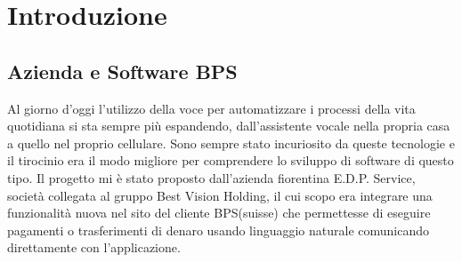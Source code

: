 \chapter{Introduzione}

\section{Azienda e Software BPS}
Al giorno d'oggi l'utilizzo della voce per automatizzare i processi della vita quotidiana si sta sempre più espandendo, dall'assistente vocale nella propria casa a quello nel proprio cellulare. Sono sempre stato incuriosito da queste tecnologie e il tirocinio era il modo migliore per comprendere lo sviluppo di software di questo tipo. Il progetto mi è stato proposto dall'azienda fiorentina E.D.P. Service, società collegata al gruppo Best Vision Holding, il cui scopo era integrare una funzionalità nuova nel sito del cliente BPS(suisse) che permettesse di eseguire pagamenti o trasferimenti di denaro usando linguaggio naturale comunicando direttamente con l'applicazione.


